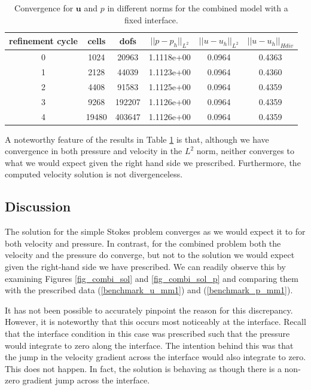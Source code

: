 \documentclass[12pt,a4paper]{article}
\theoremstyle{definition}
\begin{document}
\begin{table}[H]
	\begin{center}
	\begin{tabular}{|c|c|c|c|c|c|} \hline
		refinement cycle & cells & dofs & $||p-p_h||_{L^2}$ & $||u-u_h||_{L^2}$ & $||u-u_h||_{Hdiv}$\\ \hline
		0 & 1024 & 20963 & 1.1118e+00 & 0.0964 & 0.4363\\ \hline
		1 & 2128 & 44039 & 1.1123e+00 & 0.0964 & 0.4360\\ \hline
		2 & 4408 & 91583 & 1.1125e+00 & 0.0964 & 0.4359\\ \hline
		3 & 9268 & 192207 & 1.1126e+00 & 0.0964 & 0.4359\\ \hline
		4 & 19480 & 403647 & 1.1126e+00 & 0.0964 & 0.4359\\ \hline
	\end{tabular}
		\caption{Convergence for $\textbf{u}$ and $p$ in different norms for the combined model with a fixed interface.}
		\label{tablebenchmark_convergence_mm1}
	\end{center}
\end{table}
\vspace{-10mm}
A noteworthy feature of the results in Table \ref{tablebenchmark_convergence_mm1} is that, although we have convergence in both pressure and velocity in the $L^2$ norm, neither converges to what we would expect given the right hand side we prescribed.  Furthermore, the computed velocity solution is not divergenceless.
\subsection{Discussion}\label{sec_dealii_discussion}
The solution for the simple Stokes problem converges as we would expect it to for both velocity and pressure.  In contrast, for the combined problem both the velocity and the pressure do converge, but not to the solution we would expect given the right-hand side we have prescribed.   We can readily observe this by examining Figures \ref{fig_combi_sol} and \ref{fig_combi_sol_p} and comparing them with the prescribed data (\ref{benchmark_u_mm1}) and (\ref{benchmark_p_mm1}). 


It has not been possible to accurately pinpoint the reason for this discrepancy.    However, it is noteworthy that this occurs most noticeably at the interface.  Recall that the interface condition in this case was prescribed such that the pressure would integrate to zero along the interface.  The intention behind this was that the jump in the velocity gradient across the interface would also integrate to zero.  This does not happen.  In fact, the solution is behaving as though there is a non-zero gradient jump across the interface.  
\end{document}
